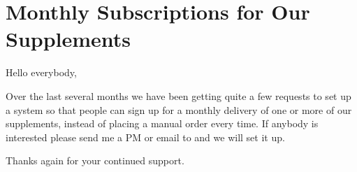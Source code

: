 \chapter{Monthly Subscriptions for Our Supplements}

\begin{refsection}

Hello everybody,

Over the last several months we have been getting quite a few requests to set up a system so that people can sign up for a monthly delivery of one or more of our supplements, instead of placing a manual order every time. If anybody is interested please send me a PM or email to  and we will set it up.

Thanks again for your continued support.

\printbibliography[heading=subbibliography]

\end{refsection}